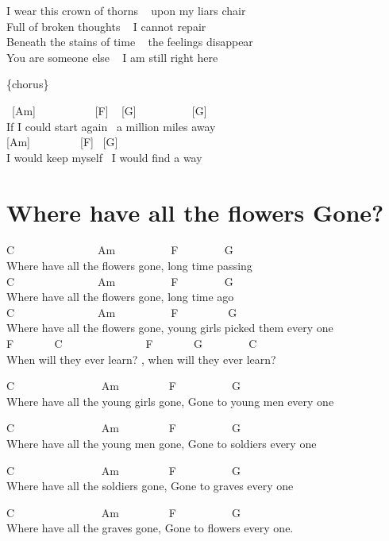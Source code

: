 \documentclass[
  letterpaper,
  twoside=false]{scrbook}
\begin{document}
I wear this crown of thorns ~ upon my liar\textquotesingle s chair\\
Full of broken thoughts ~ I cannot repair\\
Beneath the stains of time ~ the feelings disappear\\
You are someone else ~ I am still right here

\{chorus\}

~{[}Am{]} ~ ~ ~ ~ ~ ~ {[}F{]} ~ {[}G{]} ~ ~ ~ ~ ~ ~{[}G{]}\\
If I could start again ~a million miles away\\
{[}Am{]} ~ ~ ~ ~ ~ {[}F{]} ~{[}G{]}\\
I would keep myself ~I would find a way

\hypertarget{where-have-all-the-flowers-gone}{%
\chapter{Where have all the flowers
Gone?}\label{where-have-all-the-flowers-gone}}

C ~ ~ ~ ~ ~ ~ ~ ~ ~Am ~ ~ ~ ~ ~ ~F ~ ~ ~ ~ ~G\\
Where have all the flowers gone, long time passing\\
C ~ ~ ~ ~ ~ ~ ~ ~ ~Am ~ ~ ~ ~ ~ ~F ~ ~ ~ ~ ~G\\
Where have all the flowers gone, long time ago\\
C ~ ~ ~ ~ ~ ~ ~ ~ ~Am ~ ~ ~ ~ ~ ~F ~ ~ ~ ~ ~ G\\
Where have all the flowers gone, young girls picked them every one\\
F ~ ~ ~ ~ C ~ ~ ~ ~ ~ ~ ~ ~ ~F ~ ~ ~ ~ G ~ ~ ~ ~ ~C ~\\
When will they ever learn? , when will they ever learn?

C ~ ~ ~ ~ ~ ~ ~ ~ ~ Am ~ ~ ~ ~ ~ F ~ ~ ~ ~ ~ ~G\\
Where have all the young girls gone, Gone to young men every one

C ~ ~ ~ ~ ~ ~ ~ ~ ~ Am ~ ~ ~ ~ ~ F ~ ~ ~ ~ ~ ~G\\
Where have all the young men gone, Gone to soldiers every one

C ~ ~ ~ ~ ~ ~ ~ ~ ~ Am ~ ~ ~ ~ ~ F ~ ~ ~ ~ ~ ~G ~\\
Where have all the soldiers gone, Gone to graves every one

C ~ ~ ~ ~ ~ ~ ~ ~ ~ Am ~ ~ ~ ~ ~ F ~ ~ ~ ~ ~ ~G ~\\
Where have all the graves gone, Gone to flowers every one.
\end{document}
